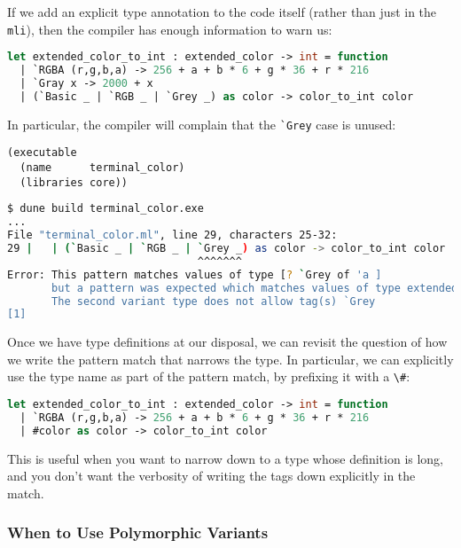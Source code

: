 If we add an explicit type annotation to the code itself (rather than
just in the \passthrough{\lstinline!mli!}), then the compiler has enough
information to warn us:

\begin{lstlisting}[language=Caml]
let extended_color_to_int : extended_color -> int = function
  | `RGBA (r,g,b,a) -> 256 + a + b * 6 + g * 36 + r * 216
  | `Gray x -> 2000 + x
  | (`Basic _ | `RGB _ | `Grey _) as color -> color_to_int color
\end{lstlisting}

In particular, the compiler will complain that the
\passthrough{\lstinline!`Grey!} case is unused:

\begin{lstlisting}
(executable
  (name      terminal_color)
  (libraries core))
\end{lstlisting}

\begin{lstlisting}[language=bash]
$ dune build terminal_color.exe
...
File "terminal_color.ml", line 29, characters 25-32:
29 |   | (`Basic _ | `RGB _ | `Grey _) as color -> color_to_int color
                              ^^^^^^^
Error: This pattern matches values of type [? `Grey of 'a ]
       but a pattern was expected which matches values of type extended_color
       The second variant type does not allow tag(s) `Grey
[1]
\end{lstlisting}

Once we have type definitions at our disposal, we can revisit the
question of how we write the pattern match that narrows the type. In
particular, we can explicitly use the type name as part of the pattern
match, by prefixing it with a \passthrough{\lstinline!\#!}:

\begin{lstlisting}[language=Caml]
let extended_color_to_int : extended_color -> int = function
  | `RGBA (r,g,b,a) -> 256 + a + b * 6 + g * 36 + r * 216
  | #color as color -> color_to_int color
\end{lstlisting}

This is useful when you want to narrow down to a type whose definition
is long, and you don't want the verbosity of writing the tags down
explicitly in the match.

\hypertarget{when-to-use-polymorphic-variants}{%
\subsubsection{When to Use Polymorphic
Variants}\label{when-to-use-polymorphic-variants}}

